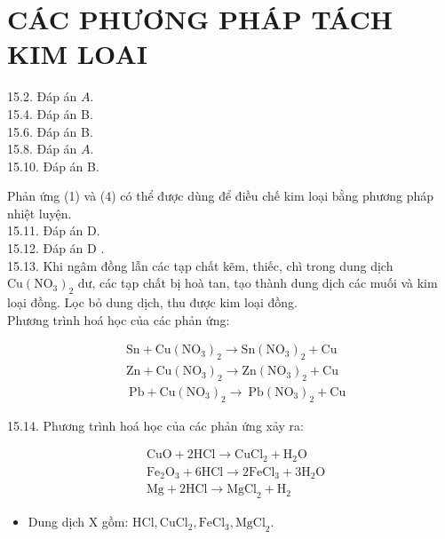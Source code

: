 \documentclass[10pt]{article}
\begin{document}
\section*{CÁC PHƯƠNG PHÁP TÁCH KIM LOAI}
15.2. Đáp án $A$.\\
15.4. Đáp án B.\\
15.6. Đáp án B.\\
15.8. Đáp án $A$.\\
15.10. Đáp án B.

Phản ứng (1) và (4) có thể được dùng để điều chế kim loại bằng phương pháp nhiệt luyện.\\
15.11. Đáp án D.\\
15.12. Đáp án D .\\
15.13. Khi ngâm đồng lẫn các tạp chất kẽm, thiếc, chì trong dung dịch $\mathrm{Cu}\left(\mathrm{NO}_{3}\right)_{2}$ dư, các tạp chất bị hoà tan, tạo thành dung dịch các muối và kim loại đồng. Lọc bỏ dung dịch, thu được kim loại đồng.\\
Phương trình hoá học của các phản ứng:

$$
\begin{aligned}
& \mathrm{Sn}+\mathrm{Cu}\left(\mathrm{NO}_{3}\right)_{2} \rightarrow \mathrm{Sn}\left(\mathrm{NO}_{3}\right)_{2}+\mathrm{Cu} \\
& \mathrm{Zn}+\mathrm{Cu}\left(\mathrm{NO}_{3}\right)_{2} \rightarrow \mathrm{Zn}\left(\mathrm{NO}_{3}\right)_{2}+\mathrm{Cu} \\
& \mathrm{~Pb}+\mathrm{Cu}\left(\mathrm{NO}_{3}\right)_{2} \rightarrow \mathrm{~Pb}\left(\mathrm{NO}_{3}\right)_{2}+\mathrm{Cu}
\end{aligned}
$$

15.14. Phương trình hoá học của các phản ứng xảy ra:

$$
\begin{aligned}
& \mathrm{CuO}+2 \mathrm{HCl} \rightarrow \mathrm{CuCl}_{2}+\mathrm{H}_{2} \mathrm{O} \\
& \mathrm{Fe}_{2} \mathrm{O}_{3}+6 \mathrm{HCl} \rightarrow 2 \mathrm{FeCl}_{3}+3 \mathrm{H}_{2} \mathrm{O} \\
& \mathrm{Mg}+2 \mathrm{HCl} \rightarrow \mathrm{MgCl}_{2}+\mathrm{H}_{2}
\end{aligned}
$$

\begin{itemize}
  \item Dung dịch X gồm: $\mathrm{HCl}, \mathrm{CuCl}_{2}, \mathrm{FeCl}_{3}, \mathrm{MgCl}_{2}$.
\end{itemize}
\end{document}
